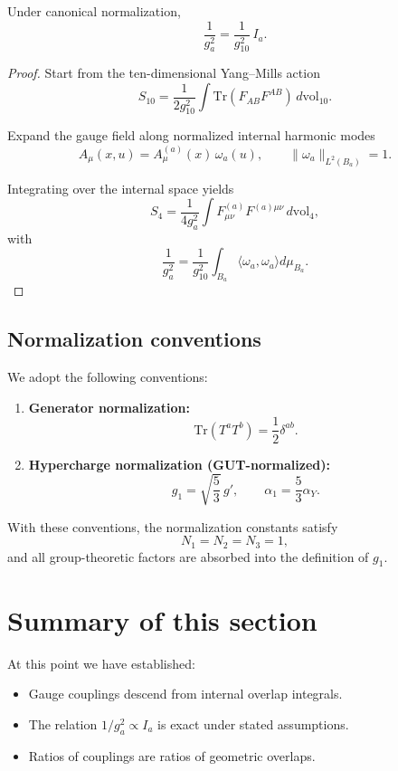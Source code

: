 \documentclass[11pt]{article}
\begin{document}
\begin{proposition}
Under canonical normalization,
\[
\frac{1}{g_a^2} = \frac{1}{g_{10}^2}\, I_a.
\]
\end{proposition}

\begin{proof}
Start from the ten-dimensional Yang–Mills action
\[
S_{10} = \frac{1}{2g_{10}^2}\int \mathrm{Tr}(F_{AB}F^{AB})\, d\mathrm{vol}_{10}.
\]

Expand the gauge field along normalized internal harmonic modes
\[
A_\mu(x,u) = A_\mu^{(a)}(x)\,\omega_a(u),
\qquad \|\omega_a\|_{L^2(B_a)}=1.
\]

Integrating over the internal space yields
\[
S_4 = \frac{1}{4g_a^2}\int F_{\mu\nu}^{(a)}F^{(a)\mu\nu}\, d\mathrm{vol}_4,
\]
with
\[
\frac{1}{g_a^2} = \frac{1}{g_{10}^2}\int_{B_a}\langle \omega_a,\omega_a\rangle d\mu_{B_a}.
\]
\end{proof}

\subsection{Normalization conventions}

We adopt the following conventions:

\begin{enumerate}
\item \textbf{Generator normalization:}
\[
\mathrm{Tr}(T^a T^b)=\frac{1}{2}\delta^{ab}.
\]

\item \textbf{Hypercharge normalization (GUT-normalized):}
\[
g_1=\sqrt{\frac{5}{3}}\, g',
\qquad
\alpha_1=\frac{5}{3}\alpha_Y.
\]
\end{enumerate}

With these conventions, the normalization constants satisfy
\[
N_1=N_2=N_3=1,
\]
and all group-theoretic factors are absorbed into the definition of $g_1$.

\section{Summary of this section}

At this point we have established:

\begin{itemize}
\item Gauge couplings descend from internal overlap integrals.
\item The relation $1/g_a^2 \propto I_a$ is exact under stated assumptions.
\item Ratios of couplings are ratios of geometric overlaps.
\end{itemize}
\end{document}
